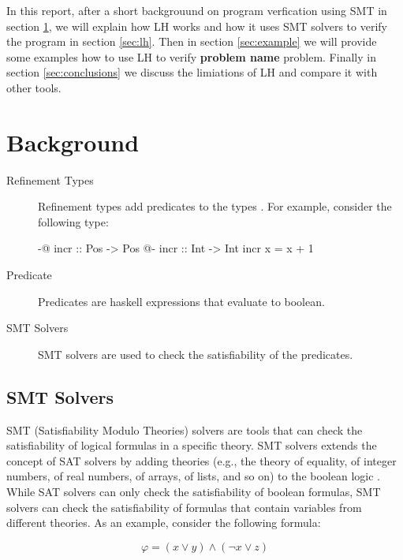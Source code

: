 \documentclass[]{rptuseminar}
\begin{document}
In this report, after a short backgrouund on program verfication using SMT in section \ref{sec:background}, we will explain 
how LH works and how it uses SMT solvers to 
verify the program in section \ref{sec:lh}. Then in section \ref{sec:example} we will provide some examples how to use 
LH to verify \textbf{problem name} problem. Finally in section \ref{sec:conclusions} we 
discuss the limiations of LH and compare it with other tools.


\section{Background}
\label{sec:background}
\begin{description}
  \item[Refinement Types] Refinement types add predicates to the types \cite{jhala_programming_2020}. For example, consider the following type:


    \begin{haskell}
      {-@ incr :: Pos -> Pos @-}
      incr :: Int -> Int
      incr x = x + 1
    \end{haskell}

  \item[Predicate] Predicates are haskell expressions that evaluate to boolean.
  \item[SMT Solvers] SMT solvers are used to check the satisfiability of the predicates. 
  
\end{description}
\subsection{SMT Solvers}
SMT (Satisfiability Modulo Theories) solvers are tools that can check the satisfiability of logical formulas in a specific theory.
SMT solvers extends the concept of SAT solvers by adding theories (e.g., the theory of equality, 
of integer numbers, of real numbers, of arrays, of lists, and so on) to the boolean logic \cite{clarke_satisfiability_2018}.
While SAT solvers can only check the satisfiability of boolean formulas, SMT solvers can check the satisfiability of formulas 
that contain variables from different theories. 
As an example, consider the following formula:

\begin{equation}
  \varphi = (x \lor y) \land (\lnot x \lor z)
\end{equation}
\end{document}
